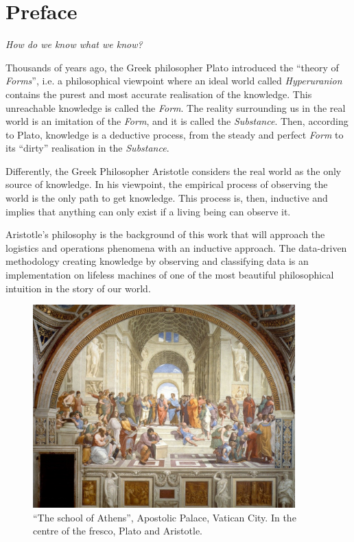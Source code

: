 \chapter*{Preface}


\epigraph{\textit{How do we know what we know?}}{}

Thousands of years ago, the Greek philosopher Plato introduced the “theory of \textit{Forms}”, i.e. a philosophical viewpoint where an ideal world called \textit{Hyperuranion} contains the purest and most accurate realisation of the knowledge. This unreachable knowledge is called the \textit{Form}. The reality surrounding us in the real world is an imitation of the \textit{Form}, and it is called the \textit{Substance}. Then, according to Plato, knowledge is a deductive process, from the steady and perfect \textit{Form} to its “dirty” realisation in the \textit{Substance}.\par

Differently, the Greek Philosopher Aristotle considers the real world as the only source of knowledge. In his viewpoint, the empirical process of observing the world is the only path to get knowledge. This process is, then, inductive and implies that anything can only exist if a living being can observe it.\par

Aristotle’s philosophy is the background of this work that will approach the logistics and operations phenomena with an inductive approach. The data-driven methodology creating knowledge by observing and classifying data is an implementation on lifeless machines of one of the most beautiful philosophical intuition in the story of our world.\par


\begin{figure}[hbt!]
\centering
\includegraphics[width=0.9\textwidth]{other/preface_figures/laScuolaDiAtene.jpg}
\captionsetup{type=figure}
\caption{“The school of Athens”, Apostolic Palace, Vatican City. In the centre of the fresco, Plato and Aristotle.}
\end{figure}
